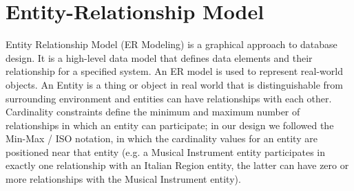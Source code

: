 \documentclass[../../DD.tex]{subfiles}
\begin{document}
\section{Entity-Relationship Model}

	Entity Relationship Model (ER Modeling) is a graphical approach to database design. It is a high-level data model that defines data elements and their relationship for a specified system. An ER model is used to represent real-world objects. An Entity is a thing or object in real world that is distinguishable from surrounding environment and entities can have relationships with each other. Cardinality constraints define the minimum and maximum number of relationships in which an entity can participate; in our design we followed the Min-Max / ISO notation, in which the cardinality values for an entity are positioned near that entity (e.g. a Musical Instrument entity participates in exactly one relationship with an Italian Region entity, the latter can have zero or more relationships with the Musical Instrument entity).
	
	
\end{document}
